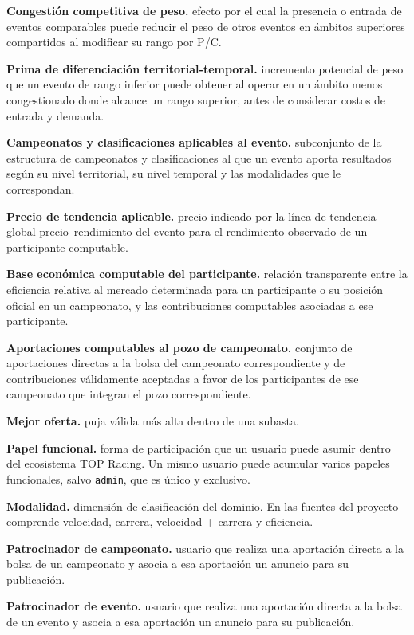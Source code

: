 \documentclass[10pt,letterpaper]{article}
\begin{document}
\noindent\textbf{Congestión competitiva de peso.} efecto por el cual la presencia o entrada de eventos comparables puede reducir el peso de otros eventos en ámbitos superiores compartidos al modificar su rango por P/C.\par
\noindent\textbf{Prima de diferenciación territorial-temporal.} incremento potencial de peso que un evento de rango inferior puede obtener al operar en un ámbito menos congestionado donde alcance un rango superior, antes de considerar costos de entrada y demanda.\par
\noindent\textbf{Campeonatos y clasificaciones aplicables al evento.} subconjunto de la estructura de campeonatos y clasificaciones al que un evento aporta resultados según su nivel territorial, su nivel temporal y las modalidades que le correspondan.\par
\noindent\textbf{Precio de tendencia aplicable.} precio indicado por la línea de tendencia global precio--rendimiento del evento para el rendimiento observado de un participante computable.\par
\noindent\textbf{Base económica computable del participante.} relación transparente entre la eficiencia relativa al mercado determinada para un participante o su posición oficial en un campeonato, y las contribuciones computables asociadas a ese participante.\par
\noindent\textbf{Aportaciones computables al pozo de campeonato.} conjunto de aportaciones directas a la bolsa del campeonato correspondiente y de contribuciones válidamente aceptadas a favor de los participantes de ese campeonato que integran el pozo correspondiente.\par
\noindent\textbf{Mejor oferta.} puja válida más alta dentro de una subasta.\par
\noindent\textbf{Papel funcional.} forma de participación que un usuario puede asumir dentro del ecosistema TOP Racing. Un mismo usuario puede acumular varios papeles funcionales, salvo \texttt{admin}, que es único y exclusivo.\par
\noindent\textbf{Modalidad.} dimensión de clasificación del dominio. En las fuentes del proyecto comprende velocidad, carrera, velocidad + carrera y eficiencia.\par
\noindent\textbf{Patrocinador de campeonato.} usuario que realiza una aportación directa a la bolsa de un campeonato y asocia a esa aportación un anuncio para su publicación.\par
\noindent\textbf{Patrocinador de evento.} usuario que realiza una aportación directa a la bolsa de un evento y asocia a esa aportación un anuncio para su publicación.\par
\end{document}
